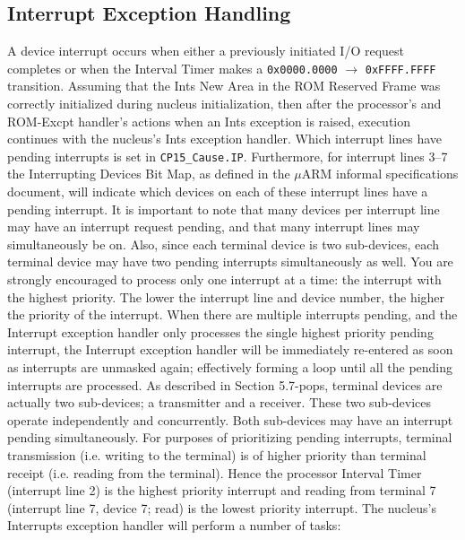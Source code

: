 \subsection{Interrupt Exception Handling}
A device interrupt occurs when either a previously initiated I/O request completes
or when the Interval Timer makes a \verb+0x0000.0000+ $\rightarrow$ \verb+0xFFFF.FFFF+ transition. Assuming 
that the Ints New Area in the ROM Reserved Frame was 
correctly initialized during nucleus initialization, then after the
processor's and ROM-Excpt handler's actions when an Ints exception is raised, 
execution continues with the nucleus's Ints exception handler. Which interrupt lines
have pending interrupts is set in \verb+CP15_Cause.IP+. Furthermore,
for interrupt lines 3--7 the Interrupting Devices Bit Map, as defined in the
$\mu$ARM informal specifications document,
will indicate which devices on each of these interrupt lines have a pending interrupt. 
It is important to note that many devices per interrupt line may have an interrupt request pending, 
and that many interrupt lines may simultaneously be on.
Also, since each terminal device is two sub-devices, each terminal device may
have two pending interrupts simultaneously as well. You are strongly encouraged
to process only one interrupt at a time: the interrupt with the highest priority. The
	lower the interrupt line and device number, the higher the priority of the interrupt.
	When there are multiple interrupts pending, and the Interrupt exception handler
	only processes the single highest priority pending interrupt, 
the Interrupt exception handler will be immediately re-entered as soon as interrupts are unmasked
	again; effectively forming a loop until all the pending interrupts are processed.
	As described in Section 5.7-pops, terminal devices are actually two sub-devices;
	a transmitter and a receiver. These two sub-devices operate independently and
	concurrently. Both sub-devices may have an interrupt pending simultaneously.
	For purposes of prioritizing pending interrupts, terminal transmission (i.e. writing
			to the terminal) is of higher priority than terminal receipt (i.e. reading from the
				terminal). Hence the processor Interval Timer (interrupt line 2) is the highest priority interrupt and reading from terminal 7 (interrupt line 7, device 7; read) is the
			lowest priority interrupt.
			The nucleus's Interrupts exception handler will perform a number of tasks:
